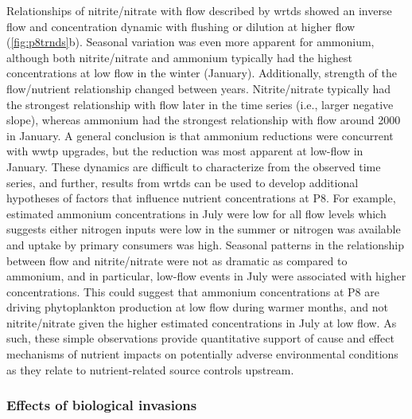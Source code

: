 \documentclass[letterpaper,12pt,oneside]{article}\usepackage[]{graphicx}\usepackage[]{color}
\begin{document}
Relationships of nitrite/nitrate with flow described by \ac{wrtds} showed an inverse flow and concentration dynamic with flushing or dilution at higher flow (\cref{fig:p8trnds}b).  Seasonal variation was even more apparent for ammonium, although both nitrite/nitrate and ammonium typically had the highest concentrations at low flow in the winter (January).  Additionally, strength of the flow/nutrient relationship changed between years. Nitrite/nitrate typically had the strongest relationship with flow later in the time series (i.e., larger negative slope), whereas ammonium had the strongest relationship with flow around 2000 in January. A general conclusion is that ammonium reductions were concurrent with \ac{wwtp} upgrades, but the reduction was most apparent at low-flow in January.  These dynamics are difficult to characterize from the observed time series, and further, results from \ac{wrtds} can be used to develop additional hypotheses of factors that influence nutrient concentrations at P8. For example, estimated ammonium concentrations in July were low for all flow levels which suggests either nitrogen inputs were low in the summer or nitrogen was available and uptake by primary consumers was high. Seasonal patterns in the relationship between flow and nitrite/nitrate were not as dramatic as compared to ammonium, and in particular, low-flow events in July were associated with higher concentrations.  This could suggest that ammonium concentrations at P8 are driving phytoplankton production at low flow during warmer months, and not nitrite/nitrate given the higher estimated concentrations in July at low flow. As such, these simple observations provide quantitative support of cause and effect mechanisms of nutrient impacts on potentially adverse environmental conditions as they relate to nutrient-related source controls upstream.

\subsubsection{Effects of biological invasions}
\end{document}
